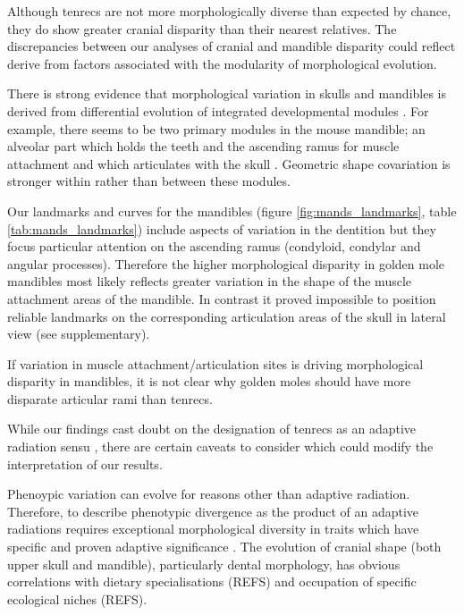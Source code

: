 \documentclass[12pt,a4paper]{article}
\begin{document}
Although tenrecs are not more morphologically diverse than expected by chance, they do show greater cranial disparity than their nearest relatives. The discrepancies between our analyses of cranial and mandible disparity could reflect derive from factors associated with the modularity of morphological evolution.

There is strong evidence that morphological variation in skulls and mandibles is derived from differential evolution of integrated developmental modules \citep[reviewed by][]{Klingenberg2013a}.
For example, there seems to be two primary modules in the mouse mandible; an alveolar part which holds the teeth and the ascending ramus for muscle attachment and which articulates with the skull \citep{Klingenberg2008a}. Geometric shape covariation is stronger within rather than between these modules. 

Our landmarks and curves for the mandibles (figure \ref{fig:mands_landmarks}, table \ref{tab:mands_landmarks}) include aspects of variation in the dentition but they focus particular attention on the ascending ramus (condyloid, condylar and angular processes). Therefore the higher morphological disparity in golden mole mandibles most likely reflects greater variation in the shape of the muscle attachment areas of the mandible. In contrast it proved impossible to position reliable landmarks on the corresponding articulation areas of the skull in lateral view (see supplementary).

If variation in muscle attachment/articulation sites is driving morphological disparity in mandibles, it is not clear why golden moles should have more disparate articular rami than tenrecs. 

 


While our findings cast doubt on the designation of tenrecs as an adaptive radiation sensu \citep{Losos2010a}, there are certain caveats to consider which could modify the interpretation of our results.

Phenoypic variation can evolve for reasons other than adaptive radiation. Therefore, to describe phenotypic divergence as the product of an adaptive radiations requires exceptional morphological diversity in traits which have specific and proven adaptive significance \citep{Losos2010a}. The evolution of cranial shape (both upper skull and mandible), particularly dental morphology, has obvious correlations with dietary specialisations (REFS) and occupation of specific ecological niches (REFS). 
\end{document}

